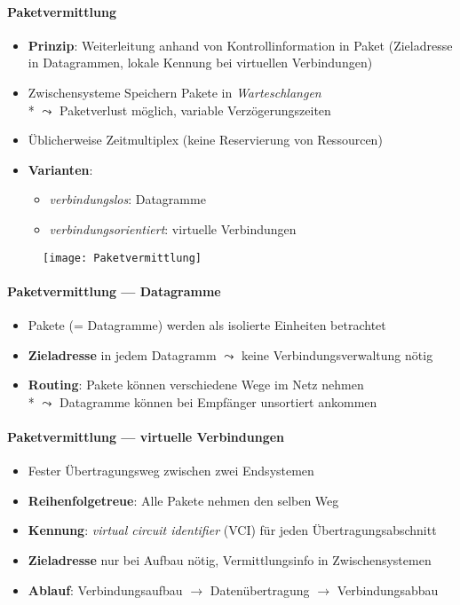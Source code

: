 \paragraph{Paketvermittlung}
\begin{itemize}
  \item \textbf{Prinzip}: Weiterleitung anhand von Kontrollinformation in Paket
    (Zieladresse in Datagrammen, lokale Kennung bei virtuellen Verbindungen)
    \item Zwischensysteme Speichern Pakete in \emph{Warteschlangen} \\* \( \leadsto \) Paketverlust möglich, variable Verzögerungszeiten
   \item Üblicherweise Zeitmultiplex (keine Reservierung von Ressourcen)
  \item \textbf{Varianten}:
  \begin{itemize}
    \item \emph{verbindungslos}: Datagramme
    \item \emph{verbindungsorientiert}: virtuelle Verbindungen
  \end{itemize}
\end{itemize}
\begin{figure}[H]\centering\label{Paketvermittlung}\texttt{[image: Paketvermittlung]}\end{figure}

\paragraph{Paketvermittlung --- Datagramme}
\begin{itemize}
  \item Pakete (= Datagramme) werden als isolierte Einheiten betrachtet
  \item \textbf{Zieladresse} in jedem Datagramm \( \leadsto \) keine Verbindungsverwaltung nötig
  \item \textbf{Routing}: Pakete können verschiedene Wege im Netz nehmen \\*
    \( \leadsto \) Datagramme können bei Empfänger unsortiert ankommen
\end{itemize}

\paragraph{Paketvermittlung --- virtuelle Verbindungen}
\begin{itemize}
  \item Fester Übertragungsweg zwischen zwei Endsystemen
  \item \textbf{Reihenfolgetreue}: Alle Pakete nehmen den selben Weg
  \item \textbf{Kennung}: \emph{virtual circuit identifier} (VCI) für jeden Übertragungsabschnitt
  \item \textbf{Zieladresse} nur bei Aufbau nötig, Vermittlungsinfo in Zwischensystemen
  \item \textbf{Ablauf}: Verbindungsaufbau \( \to \) Datenübertragung \( \to \) Verbindungsabbau
\end{itemize}

